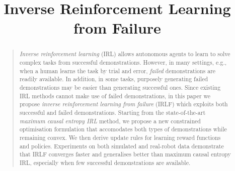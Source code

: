 \documentclass[letterpaper]{article}
\begin{document}
%
\title{Inverse Reinforcement Learning from Failure}
\maketitle
\begin{abstract}
\begin{quote}

\emph{Inverse reinforcement learning} (IRL) allows autonomous agents to learn to solve complex tasks from successful demonstrations.  However, in many settings, e.g., when a human learns the task by trial and error, \emph{failed} demonstrations are readily available.  In addition, in some tasks, purposely generating failed demonstrations may be easier than generating successful ones.  Since existing IRL methods cannot make use of failed demonstrations, in this paper we propose \emph{inverse reinforcement learning from failure} (IRLF) which exploits both successful and failed demonstrations.  Starting from the state-of-the-art \emph{maximum causal entropy IRL} method, we propose a new constrained optimisation formulation that accomodates both types of demonstrations while remaining convex.  We then derive update rules for learning reward functions and policies. Experiments on both simulated and real-robot data demonstrate that IRLF converges faster and generalises better than maximum causal entropy IRL, especially when few successful demonstrations are available.

\end{quote}
\end{abstract}
\end{document}
